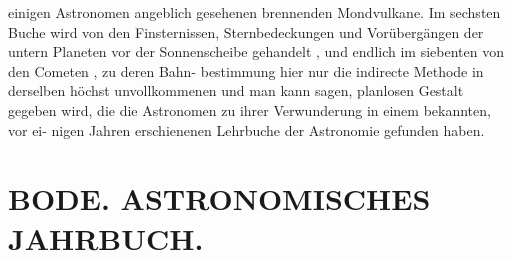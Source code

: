 \documentclass[12pt,a4paper]{article}
\begin{document}
{{{{{{{{ einigen  Astronomen  angeblich  gesehenen  brennenden  Mondvulkane. Im  sechsten  Buche  wird  von  den  Finsternissen,  Sternbedeckungen  und  Vorübergängen  der  untern Planeten  vor  der  Sonnenscheibe  gehandelt ,  und  endlich  im  siebenten  von  den  Cometen ,  zu  deren  Bahn- bestimmung hier  nur  die  indirecte  Methode  in  derselben  höchst  unvollkommenen  und  man  kann  sagen, planlosen  Gestalt  gegeben  wird,  die  die  Astronomen  zu  ihrer  Verwunderung  in  einem  bekannten,  vor  ei- nigen Jahren  erschienenen  Lehrbuche  der  Astronomie  gefunden  haben.


\section*{BODE.      ASTRONOMISCHES  JAHRBUCH.}

}}}}}}}}
\end{document}
